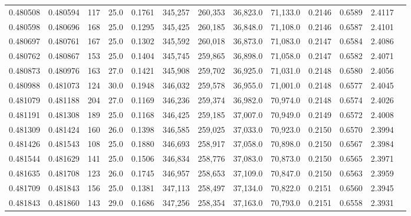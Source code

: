 \begin{tabular}{rrrrrrrrrrrrr}
0.480508 & 0.480594 &   117 & 25.0 &                                     0.1761 & 345,257 & 260,353 &  36,823.0 &  71,133.0 & 0.2146 & 0.6589 & 2.4117 \\
0.480598 & 0.480696 &   168 & 25.0 &                                     0.1295 & 345,425 & 260,185 &  36,848.0 &  71,108.0 & 0.2146 & 0.6587 & 2.4101 \\
0.480697 & 0.480761 &   167 & 25.0 &                                     0.1302 & 345,592 & 260,018 &  36,873.0 &  71,083.0 & 0.2147 & 0.6584 & 2.4086 \\
0.480762 & 0.480867 &   153 & 25.0 &                                     0.1404 & 345,745 & 259,865 &  36,898.0 &  71,058.0 & 0.2147 & 0.6582 & 2.4071 \\
0.480873 & 0.480976 &   163 & 27.0 &                                     0.1421 & 345,908 & 259,702 &  36,925.0 &  71,031.0 & 0.2148 & 0.6580 & 2.4056 \\
0.480988 & 0.481073 &   124 & 30.0 &                                     0.1948 & 346,032 & 259,578 &  36,955.0 &  71,001.0 & 0.2148 & 0.6577 & 2.4045 \\
0.481079 & 0.481188 &   204 & 27.0 &                                     0.1169 & 346,236 & 259,374 &  36,982.0 &  70,974.0 & 0.2148 & 0.6574 & 2.4026 \\
0.481191 & 0.481308 &   189 & 25.0 &                                     0.1168 & 346,425 & 259,185 &  37,007.0 &  70,949.0 & 0.2149 & 0.6572 & 2.4008 \\
0.481309 & 0.481424 &   160 & 26.0 &                                     0.1398 & 346,585 & 259,025 &  37,033.0 &  70,923.0 & 0.2150 & 0.6570 & 2.3994 \\
0.481426 & 0.481543 &   108 & 25.0 &                                     0.1880 & 346,693 & 258,917 &  37,058.0 &  70,898.0 & 0.2150 & 0.6567 & 2.3984 \\
0.481544 & 0.481629 &   141 & 25.0 &                                     0.1506 & 346,834 & 258,776 &  37,083.0 &  70,873.0 & 0.2150 & 0.6565 & 2.3971 \\
0.481635 & 0.481708 &   123 & 26.0 &                                     0.1745 & 346,957 & 258,653 &  37,109.0 &  70,847.0 & 0.2150 & 0.6563 & 2.3959 \\
0.481709 & 0.481843 &   156 & 25.0 &                                     0.1381 & 347,113 & 258,497 &  37,134.0 &  70,822.0 & 0.2151 & 0.6560 & 2.3945 \\
0.481843 & 0.481860 &   143 & 29.0 &                                     0.1686 & 347,256 & 258,354 &  37,163.0 &  70,793.0 & 0.2151 & 0.6558 & 2.3931 \\

\end{tabular}
